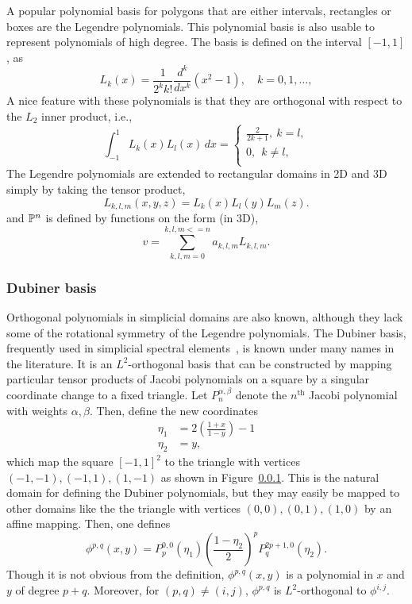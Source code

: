 A popular polynomial basis for polygons that are either intervals, rectangles or boxes are the Legendre polynomials.
This polynomial basis is also usable to represent polynomials of high degree.
The basis is defined on the interval $[-1,1]$, as
\[
L_k(x) = \frac{1}{2^k k!} \frac{d^k}{dx^k} (x^2 -1), \quad k=0,1,\ldots,
\]
A nice feature with these polynomials is that they are orthogonal
with respect to the $L_2$ inner product, i.e.,
\[
\int_{-1}^1 L_k (x) L_l(x) \, dx  =
\left\{
\begin{array}{c}
\frac{2}{2k+1}, \ k=l, \\
0 , \ \ k\not= l, \\
\end{array}
\right.
\]
The Legendre polynomials are extended to rectangular domains in 2D and
3D simply by taking the tensor product,
\[
L_{k,l,m}(x,y,z) = L_k(x) L_l(y) L_m(z) .
\]
and $\P^n$ is defined by functions on the form (in 3D),
\[
v = \sum_{k,l,m=0}^{k,l,m <= n}   a_{k,l,m} L_{k,l,m} .
\]

\subsubsection{Dubiner basis}

Orthogonal polynomials in simplicial domains are also known, although
they lack some of the rotational symmetry of the Legendre polynomials.
The Dubiner basis, frequently used in simplicial spectral
elements~\cite{}, is known under many names in the literature.  It is
an \( L^2 \)-orthogonal basis that can be constructed by mapping particular
tensor products of Jacobi polynomials on a square by a singular
coordinate change to a fixed triangle.
Let \( P^{\alpha,\beta}_n \) denote the \( n^\mathrm{th} \) Jacobi
polynomial with weights \( \alpha, \beta \).  Then, define the
new coordinates
\begin{equation}
\label{eq:dubcoord}
\begin{split}
\eta_1 & = 2\left(\frac{1+x}{1-y}\right)-1 \\
\eta_2 & = y,
\end{split}
\end{equation}
which map the square \( [-1,1]^2 \) to the triangle with
vertices \( (-1,-1),(-1,1),(1,-1) \) as shown in Figure~\ref{}.  This
is the natural domain for defining the Dubiner polynomials, but they
may easily be mapped to other domains like the the triangle with
vertices
\( (0,0) , (0,1) , (1,0) \) by an affine mapping.
Then, one defines
\begin{equation}
\phi^{p,q}(x,y) = P_p^{0,0}(\eta_1) \left( \frac{1-\eta_2}{2}
\right)^p P_q^{2p+1,0}(\eta_2).
\end{equation}
Though it is not obvious from the definition, \( \phi^{p,q}(x,y) \) is
a polynomial in \( x \) and \( y \) of degree \( p + q \).  Moreover,
for \( (p,q) \neq (i,j) \), \( \phi^{p,q} \) is \( L^2 \)-orthogonal to \(
\phi^{i,j} \).

